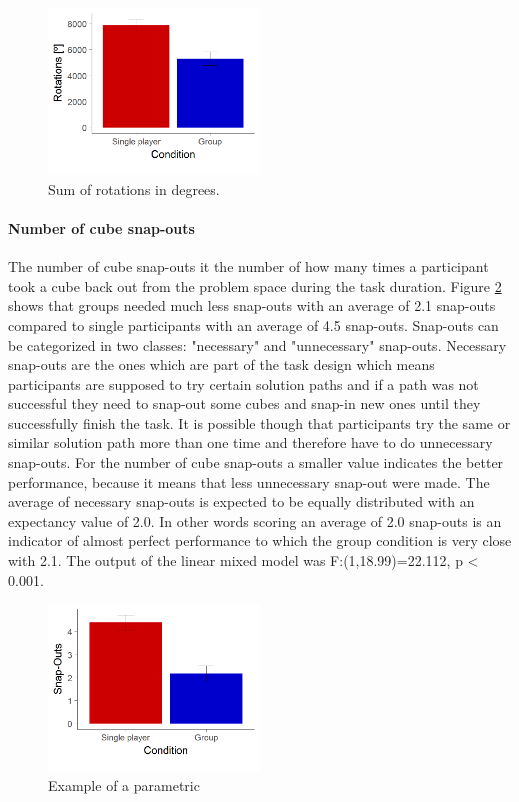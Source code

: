 \documentclass{article}
\begin{document}
\begin{figure}[h]
\centering
\includegraphics[width=0.5\textwidth]{results_rotations}
\caption{Sum of rotations in degrees.}
\label{fig:results_rotations}
\end{figure}

\paragraph{Number of cube snap-outs}
The number of cube snap-outs it the number of how many times a participant took a cube back out from the problem space during the task duration. Figure \ref{fig:results_snap_outs} shows that groups needed much less snap-outs with an average of 2.1 snap-outs compared to single participants with an average of 4.5 snap-outs. 
Snap-outs can be categorized in two classes: "necessary" and "unnecessary" snap-outs. Necessary snap-outs are the ones which are part of the task design which means participants are supposed to try certain solution paths and if a path was not successful they need to snap-out some cubes and snap-in new ones until they successfully finish the task. It is possible though that participants try the same or similar solution path more than one time and therefore have to do unnecessary snap-outs. For the number of cube snap-outs a smaller value indicates the better performance, because it means that less unnecessary snap-out were made. The average of necessary snap-outs is expected to be equally distributed with an expectancy value of 2.0. In other words scoring an average of 2.0 snap-outs is an indicator of almost perfect performance to which the group condition is very close with 2.1.
The output of the linear mixed model was F:(1,18.99)=22.112, p < 0.001.

\begin{figure}[h]
\centering
\includegraphics[width=0.5\textwidth]{results_snap_outs}
\caption{Example of a parametric }
\label{fig:results_snap_outs}
\end{figure}
\end{document}
